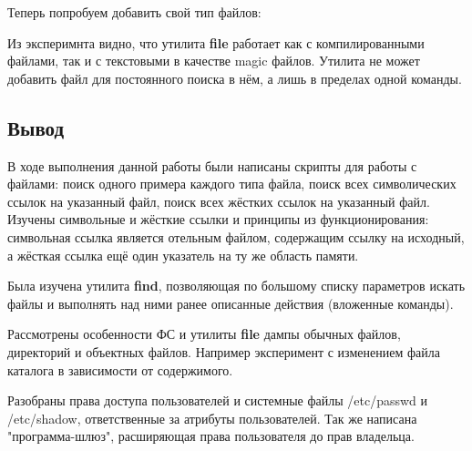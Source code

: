 \documentclass[a4paper]{article}
\begin{document}
Теперь попробуем добавить свой тип файлов:

Из эксперимнта  видно, что утилита \textbf{file} работает как с компилированными файлами, так и с текстовыми в качестве  magic файлов. Утилита не может добавить файл для постоянного поиска в нём, а лишь в пределах одной команды.
\subsection{ Вывод}
В ходе выполнения данной работы были написаны скрипты для работы с файлами: поиск одного примера каждого типа файла, поиск всех символических ссылок на указанный файл, поиск всех жёстких ссылок на указанный файл. Изучены символьные и жёсткие ссылки и принципы из функционирования: символьная ссылка является отельным файлом, содержащим ссылку на исходный, а жёсткая ссылка ещё один указатель на ту же область памяти.

Была изучена утилита \textbf{find}, позволяющая по большому списку параметров искать файлы и выполнять над ними ранее описанные действия (вложенные команды).

Рассмотрены особенности ФС и утилиты \textbf{file} дампы обычных файлов, директорий и объектных файлов. Например эксперимент с изменением файла каталога в зависимости от содержимого.

Разобраны права доступа пользователей и системные файлы /etc/passwd и /etc/shadow, ответственные за атрибуты пользователей. Так же написана "программа-шлюз", расширяющая права пользователя до прав владельца. 
\end{document}
